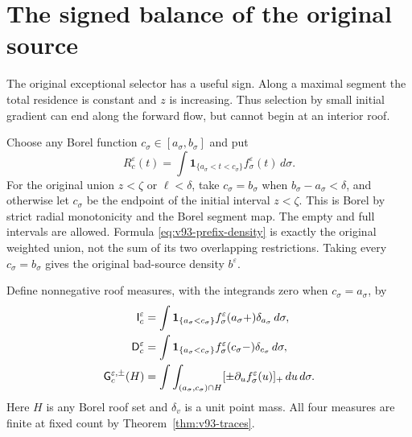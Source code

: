 \section{The signed balance of the original source}
\label{sec:v93-balance}
The original exceptional selector has a useful sign. Along a maximal
segment the total residence is constant and $z$ is increasing. Thus
selection by small initial gradient can end along the forward flow,
but cannot begin at an interior roof.

Choose any Borel function $c_\sigma\in[a_\sigma,b_\sigma]$ and put
\begin{equation}\label{eq:v93-prefix-density}
 R_c^\varepsilon(t)=\int
   \mathbf1_{\{a_\sigma<t<c_\sigma\}}f_\sigma^\varepsilon(t)\,d\sigma.
\end{equation}
For the original union $z<\zeta$ or $\ell<\delta$, take
$c_\sigma=b_\sigma$ when $b_\sigma-a_\sigma<\delta$, and otherwise
let $c_\sigma$ be the endpoint of the initial interval $z<\zeta$.
This is Borel by strict radial monotonicity and the Borel segment map.
The empty and full intervals are allowed. Formula
\eqref{eq:v93-prefix-density} is exactly the original weighted union,
not the sum of its two overlapping restrictions. Taking every
$c_\sigma=b_\sigma$ gives the original bad-source density $b^\varepsilon$.

Define nonnegative roof measures, with the integrands zero when
$c_\sigma=a_\sigma$, by
\begin{align}
 \mathsf I_c^\varepsilon
   &=\int\mathbf1_{\{a_\sigma<c_\sigma\}}
             f_\sigma^\varepsilon(a_\sigma+)\delta_{a_\sigma}\,d\sigma,
                                                       \notag\\
 \mathsf D_c^\varepsilon
   &=\int\mathbf1_{\{a_\sigma<c_\sigma\}}
             f_\sigma^\varepsilon(c_\sigma-)\delta_{c_\sigma}\,d\sigma,
                                                       \notag\\
 \mathsf G_c^{\varepsilon,\pm}(H)
   &=\int\int_{(a_\sigma,c_\sigma)\cap H}
                   [\pm\partial_u f_\sigma^\varepsilon(u)]_+\,du\,d\sigma.
                                                       \label{eq:v93-measures}
\end{align}
Here $H$ is any Borel roof set and $\delta_v$ is a unit point mass.
All four measures are finite at fixed count by
Theorem~\ref{thm:v93-traces}.

